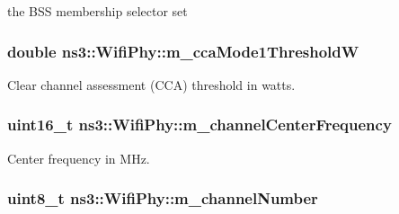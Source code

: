 the B\+SS membership selector set 

\subsubsection[{\texorpdfstring{m\+\_\+cca\+Mode1\+ThresholdW}{m_ccaMode1ThresholdW}}]{\setlength{\rightskip}{0pt plus 5cm}double ns3\+::\+Wifi\+Phy\+::m\+\_\+cca\+Mode1\+ThresholdW\hspace{0.3cm}{\ttfamily [private]}}\hypertarget{classns3_1_1WifiPhy_af3b182cae6a9df918d777fe069adf824}{}\label{classns3_1_1WifiPhy_af3b182cae6a9df918d777fe069adf824}


Clear channel assessment (C\+CA) threshold in watts. 

\subsubsection[{\texorpdfstring{m\+\_\+channel\+Center\+Frequency}{m_channelCenterFrequency}}]{\setlength{\rightskip}{0pt plus 5cm}uint16\+\_\+t ns3\+::\+Wifi\+Phy\+::m\+\_\+channel\+Center\+Frequency\hspace{0.3cm}{\ttfamily [private]}}\hypertarget{classns3_1_1WifiPhy_a4a481fa0f089d488e1520022dc353aca}{}\label{classns3_1_1WifiPhy_a4a481fa0f089d488e1520022dc353aca}


Center frequency in M\+Hz. 

\subsubsection[{\texorpdfstring{m\+\_\+channel\+Number}{m_channelNumber}}]{\setlength{\rightskip}{0pt plus 5cm}uint8\+\_\+t ns3\+::\+Wifi\+Phy\+::m\+\_\+channel\+Number\hspace{0.3cm}{\ttfamily [private]}}\hypertarget{classns3_1_1WifiPhy_adb98cbe4c4c82208862a25b6ad908765}{}\label{classns3_1_1WifiPhy_adb98cbe4c4c82208862a25b6ad908765}


